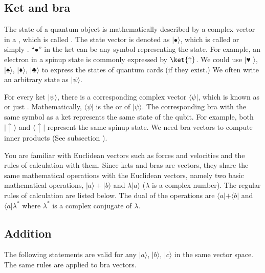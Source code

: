 \documentclass[letterpaper,10pt,english]{jupyterBook}
\begin{document}
\subsection{Ket and bra}
\label{\detokenize{qmsummary/vectors:ket-and-bra}}
\sphinxAtStartPar
The state of a quantum object is mathematically described by a complex vector in a , which is called . The state vector is denoted as \(|\bullet\rangle\), which is called  or simply .  “\(\bullet\)” in the ket can be any symbol representing the state.  For example, an electron in a spin\sphinxhyphen{}up state is commonly expressed by \(\ket{\uparrow}\). We could use \(|\)♥ \(\rangle\), \(|\)♠\(\rangle\), \(|\)♦\(\rangle\), \(|\)♣\(\rangle\) to express the states of quantum cards (if they exist.)  We often write an arbitrary state as \(| \psi\rangle\).

\sphinxAtStartPar
For every ket \(|\psi\rangle\), there is a corresponding complex vector \(\langle\psi|\), which is known as  or just . Mathematically, \(\langle\psi|\) is the  or  of \(|\psi\rangle\).
The corresponding bra with the same symbol as a ket represents the same state of the qubit.  For example, both \(|\uparrow\rangle\) and \(\langle\uparrow|\) represent the same spin\sphinxhyphen{}up state.
We need bra vectors to compute inner products (See subsection {\hyperref[\detokenize{qmsummary/vectors:subsec-innerproduct}]{}}).

\sphinxAtStartPar
You are familiar with Euclidean vectors such as forces and velocities and the rules of calculation with them.
Since kets and bras are vectors, they share the same mathematical operations with the Euclidean vectors, namely two basic mathematical operations,  \(|a\rangle+|b\rangle\) and  \(\lambda |a\rangle\) (\(\lambda\) is a complex number).  The regular rules of calculation are listed below.  The dual of the operations are \(\langle a| + \langle b|\) and \(\langle a | \lambda^*\) where \(\lambda^*\) is a complex conjugate of \(\lambda\).


\subsection{Addition}
\label{\detokenize{qmsummary/vectors:addition}}
\sphinxAtStartPar
The following statements are valid for any \(|a\rangle\), \(|b\rangle\), \(|c\rangle\) in the same vector space.
The same rules are applied to bra vectors.
\end{document}
